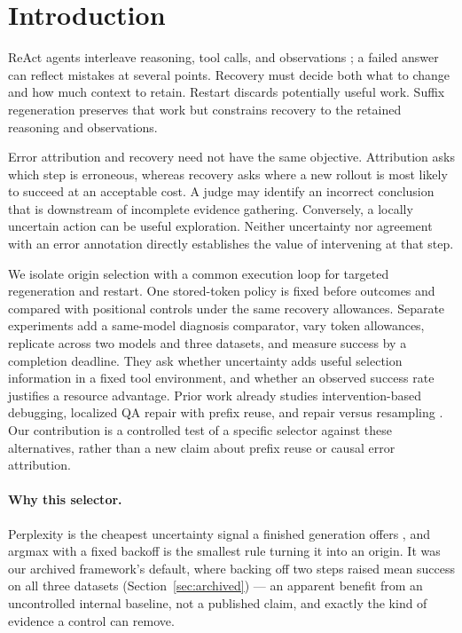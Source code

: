 \documentclass{article}
\begin{document}
\section{Introduction}
ReAct agents interleave reasoning, tool calls, and observations
\citep{yao2023react}; a failed answer can reflect mistakes at several points.
Recovery must decide both what to change and how much context to retain.
Restart discards potentially useful work. Suffix regeneration preserves
that work but constrains recovery to the retained reasoning and observations.

Error attribution and recovery need not have the same objective. Attribution
asks which step is erroneous, whereas recovery asks where a new rollout is
most likely to succeed at an acceptable cost. A judge may identify an
incorrect conclusion that is downstream of incomplete evidence gathering.
Conversely, a locally uncertain action can be useful exploration. Neither
uncertainty nor agreement with an error annotation directly establishes
the value of intervening at that step.

We isolate origin selection with a common execution loop for targeted
regeneration and restart. One stored-token policy is fixed before outcomes
and compared with positional controls under the same recovery allowances.
Separate experiments add a same-model diagnosis comparator, vary token
allowances, replicate across two models and three datasets, and measure
success by a completion deadline. They ask whether
uncertainty adds useful selection information in a fixed tool environment,
and whether an observed success rate justifies a resource advantage.
Prior work already studies intervention-based debugging, localized QA
repair with prefix reuse, and repair versus resampling
\citep{ma2026dover,jiao2026doctor,luan2026symtrace}. Our contribution is a
controlled test of a specific selector against these alternatives, rather
than a new claim about prefix reuse or causal error attribution.

\paragraph{Why this selector.}
Perplexity is the cheapest uncertainty signal a finished generation offers
\citep{kadavath2022language,manakul2023selfcheckgpt}, and argmax with a fixed
backoff is the smallest rule turning it into an origin. It was our archived
framework's default, where backing off two steps raised mean success on all
three datasets (Section~\ref{sec:archived}) --- an apparent benefit from an
uncontrolled internal baseline, not a published claim, and exactly the kind of
evidence a control can remove.
\end{document}
